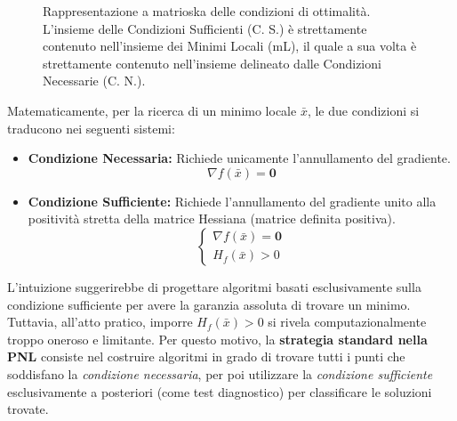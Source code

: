 \documentclass[12pt, a4paper]{article}
\begin{document}
	\begin{figure}[H]
		\centering
		\caption{Rappresentazione a matrioska delle condizioni di ottimalità. L'insieme delle Condizioni Sufficienti (C. S.) è strettamente contenuto nell'insieme dei Minimi Locali (mL), il quale a sua volta è strettamente contenuto nell'insieme delineato dalle Condizioni Necessarie (C. N.).}
	\end{figure}
	
	Matematicamente, per la ricerca di un minimo locale $\bar{x}$, le due condizioni si traducono nei seguenti sistemi:
	\begin{itemize}
		\item \textbf{Condizione Necessaria:} Richiede unicamente l'annullamento del gradiente.
		\[ \nabla f(\bar{x}) = \mathbf{0} \]
		\item \textbf{Condizione Sufficiente:} Richiede l'annullamento del gradiente unito alla positività stretta della matrice Hessiana (matrice definita positiva).
		\[
		\begin{cases}
			\nabla f(\bar{x}) = \mathbf{0} \\
			H_f(\bar{x}) > 0
		\end{cases}
		\]
	\end{itemize}
	
	L'intuizione suggerirebbe di progettare algoritmi basati esclusivamente sulla condizione sufficiente per avere la garanzia assoluta di trovare un minimo. Tuttavia, all'atto pratico, imporre $H_f(\bar{x}) > 0$ si rivela computazionalmente troppo oneroso e limitante. 
	Per questo motivo, la \textbf{strategia standard nella PNL} consiste nel costruire algoritmi in grado di trovare tutti i punti che soddisfano la \textit{condizione necessaria}, per poi utilizzare la \textit{condizione sufficiente} esclusivamente a posteriori (come test diagnostico) per classificare le soluzioni trovate.
	
\end{document}
